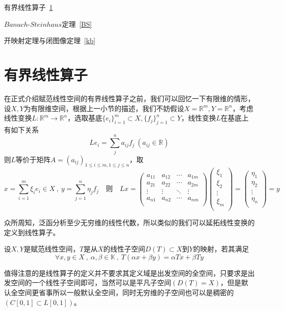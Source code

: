 \begin{introduction}
    \item 有界线性算子~\ref{BX}
    \item $Banach$-$Steinhaus$定理~\ref{BS}
    \item 开映射定理与闭图像定理~\ref{kb}
\end{introduction}
\section{有界线性算子}\label{BX}
在正式介绍赋范线性空间的有界线性算子之前，我们可以回忆一下有限维的情形，设$X,Y$为有限维空间，根据上一小节的描述，我们不妨假设$X=\mathbb{R}^m,Y=\mathbb{R}^n$，考虑线性变换$L:\mathbb{R}^m \to \mathbb{R}^n$，选取基底$\{e_i\}_{i=1}^m \subset X , \{f_j\}_{j=1}^n \subset Y$，线性变换$L$在基底上有如下关系
\[Le_i=\sum_j^na_{ij}f_j \ (a_{ij} \in \mathbb{R})\]
则$L$等价于矩阵$A=(a_{ij})_{1 \leq i \leq m , 1 \leq j \leq n}$，取
\[x=\sum_{i=1}^m\xi_ie_i \in X \ , \ y=\sum_{j=1}^n\eta_jf_j \quad \text{则} \quad Lx=
\begin{pmatrix}
    a_{11} & a_{12} & \cdots & a_{1m} \\
    a_{21} & a_{22} & \cdots & a_{2m} \\
    \vdots & \vdots & \ddots & \vdots \\
    a_{n1} & a_{n2} & \cdots & a_{nm} \\
\end{pmatrix}
\begin{pmatrix}
    \xi_1 \\ \xi_2 \\ \vdots \\ \xi_m \\
\end{pmatrix}
=\begin{pmatrix}
    \eta_1 \\ \eta_2 \\ \vdots \\ \eta_n \\
\end{pmatrix}
=y
\]

众所周知，泛函分析至少无穷维的线性代数，所以类似的我们可以延拓线性变换的定义到线性算子。
\begin{definition}[线性算子]
    设$X,Y$是赋范线性空间，$T$是从$X$的线性子空间$D(T) \subset X$到$Y$的映射，若其满足
    \[\forall x,y \in X \ , \ \alpha,\beta \in \mathbb{K} \ , \ T(\alpha x+\beta y)=\alpha Tx+\beta Ty\]
\end{definition}
值得注意的是线性算子的定义并不要求其定义域是出发空间的全空间，只要求是出发空间的一个线性子空间即可，当然可以是平凡子空间$(D(T)=X)$，但是默认全空间更省事所以一般默认全空间，同时无穷维的子空间也可以是稠密的$(C[0,1] \subset L[0,1])$。

